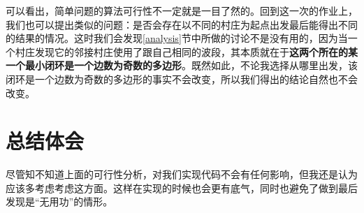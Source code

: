 \documentclass[UTF8]{ctexart}
\begin{document}
 	\indent 可以看出，简单问题的算法可行性不一定就是一目了然的。回到这一次的作业上，我们也可以提出类似的问题：\textcolor[rgb]{0.8,0.1,0.1}{是否会存在以不同的村庄为起点出发最后能得出不同的结果的情况}。这时我们会发现\ref{analysis}节中所做的讨论不是没有用的，因为当一个村庄发现它的邻接村庄使用了跟自己相同的波段，其本质就在于\textbf{这两个所在的某一个最小闭环是一个边数为奇数的多边形}。既然如此，不论我选择从哪里出发，该闭环是一个边数为奇数的多边形的事实不会改变，所以我们得出的结论自然也不会改变。

	\section{总结体会}
		\indent 尽管知不知道上面的可行性分析，对我们实现代码不会有任何影响，但我还是认为应该多考虑考虑这方面。这样在实现的时候也会更有底气，同时也避免了做到最后发现是“无用功”的情形。


\end{document}
